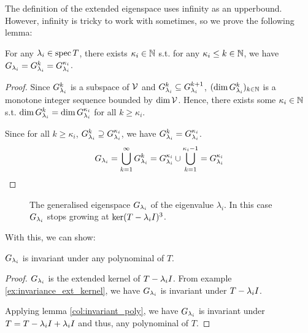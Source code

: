 The definition of the extended eigenspace uses infinity as an upperbound.
However, infinity is tricky to work with sometimes, so we prove the following lemma:

\begin{lemma} \label{lem:conv}
    For any \(\lambda_i\in\operatorname{spec} T\), there exists \(\kappa_i\in\mathbb{N}\) s.t. for any \(\kappa_i\le k\in\mathbb{N}\), we have \(G_{\lambda_i}=G_{\lambda_i}^{k}=G_{\lambda_i}^{\kappa_i}\).
\end{lemma}
\begin{proof}
    Since \(G_{\lambda_i}^{k}\) is a subspace of \(\mathcal{V}\) and \(G_{\lambda_i}^{k}\subseteq G_{\lambda_i}^{k+1}\), \((\dim G_{\lambda_i}^{k})_{k\in\mathbb{N}}\) is a monotone integer sequence bounded by \(\dim\mathcal{V}\).
    Hence, there exists some \(\kappa_i\in\mathbb{N}\) s.t. \(\dim G_{\lambda_i}^k=\dim G_{\lambda_i}^{\kappa_i}\) for all \(k\ge\kappa_i\).

    Since for all \(k\ge\kappa_i\), \(G_{\lambda_i}^k\supseteq G_{\lambda_i}^{\kappa_i}\), we have \(G_{\lambda_i}^k=G_{\lambda_i}^{\kappa_i}\).
    \begin{equation*}
        G_{\lambda_i}=\bigcup_{k=1}^{\infty}G_{\lambda_i}^k=G_{\lambda_i}^{\kappa_i}\cup\bigcup_{k=1}^{\kappa_i-1}=G_{\lambda_i}^{\kappa_i}
    \end{equation*}
\end{proof}

\begin{figure}[H] \label{fig:geneigen}
\centering
    \caption{The generalised eigenspace \( G_{\lambda_i} \) of the eigenvalue \(\lambda _i\). In this case \( G_{\lambda_i} \) stops growing at \(\ker (T - \lambda _iI)^{3} \).}
\end{figure}

With this, we can show:
\begin{lemma} \label{lem:Gi_invariance}
    \(G_{\lambda_i}\) is invariant under any polynominal of \(T\).
\end{lemma}
\begin{proof}
    \(G_{\lambda_i}\) is the extended kernel of \(T-\lambda_iI\).
    From example \ref{ex:invariance_ext_kernel}, we have \(G_{\lambda_i}\) is invariant under \(T-\lambda_iI\).

    Applying lemma \ref{col:invariant_poly}, we have \(G_{\lambda_i}\) is invariant under \(T=T-\lambda_iI+\lambda_iI\) and thus, any polynominal of \(T\).
\end{proof}

